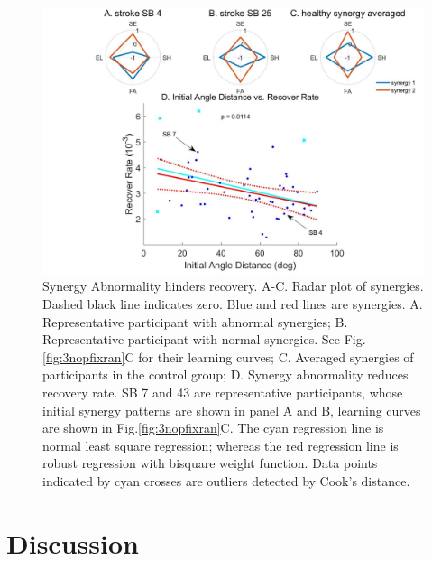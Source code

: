 \begin{figure}
	\centering
	\includegraphics[width=1\linewidth]{figures/6synergy}
	\caption[Synergy Analysis]
	{Synergy Abnormality hinders recovery. 
		A-C. Radar plot of synergies. Dashed black line indicates zero. Blue and red lines are synergies.
		A. Representative participant with abnormal synergies;
		B. Representative participant with normal synergies. See Fig.\ref{fig:3nopfixran}C for their learning curves;
		C. Averaged synergies of participants in the control group;
		D. Synergy abnormality reduces recovery rate. SB 7 and 43 are representative participants, whose initial synergy patterns are shown in panel A and B, learning curves are shown in Fig.\ref{fig:3nopfixran}C.
		The cyan regression line is normal least square regression; whereas the red regression line is robust regression with bisquare weight function. 
		Data points indicated by cyan crosses are outliers detected by Cook's distance.}
	\label{fig:6synergy}
\end{figure}



\section{Discussion}

